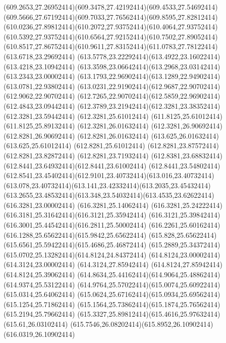 {{	\curveto(609.2653,27.26952414)(609.3478,27.42192414)(609.4533,27.54692414)
	\curveto(609.5666,27.67192414)(609.7033,27.76562414)(609.8595,27.82812414)
	\curveto(610.0236,27.89812414)(610.2072,27.93752414)(610.4064,27.93752414)
	\curveto(610.5392,27.93752414)(610.6564,27.92152414)(610.7502,27.89052414)
	\curveto(610.8517,27.86752414)(610.9611,27.83152414)(611.0783,27.78122414)
	\closepath
	\moveto(613.6718,23.29692414)
	\curveto(613.5778,23.22292414)(613.4922,23.16022414)(613.4218,23.10942414)
	\curveto(613.3598,23.06642414)(613.2968,23.03142414)(613.2343,23.00002414)
	\curveto(613.1793,22.96902414)(613.1289,22.94902414)(613.0781,22.93802414)
	\curveto(613.0231,22.91902414)(612.9687,22.90702414)(612.9062,22.90702414)
	\curveto(612.7265,22.90702414)(612.5859,22.96902414)(612.4843,23.09442414)
	\curveto(612.3789,23.21942414)(612.3281,23.38352414)(612.3281,23.59442414)
	\lineto(612.3281,25.61012414)
	\lineto(611.8125,25.61012414)
	\lineto(611.8125,25.89132414)
	\lineto(612.3281,26.01632414)
	\lineto(612.3281,26.90692414)
	\lineto(612.8281,26.90692414)
	\lineto(612.8281,26.01632414)
	\lineto(613.625,26.01632414)
	\lineto(613.625,25.61012414)
	\lineto(612.8281,25.61012414)
	\lineto(612.8281,23.87572414)
	\lineto(612.8281,23.82872414)
	\lineto(612.8281,23.71932414)
	\curveto(612.8381,23.68832414)(612.8441,23.64932414)(612.8441,23.61002414)
	\lineto(612.8441,23.54802414)
	\curveto(612.8541,23.45402414)(612.9101,23.40732414)(613.016,23.40732414)
	\curveto(613.078,23.40732414)(613.141,23.42332414)(613.2035,23.45432414)
	\curveto(613.2655,23.48532414)(613.348,23.54032414)(613.4535,23.62622414)
	\closepath
	\moveto(616.3281,23.00002414)
	\lineto(616.3281,25.14062414)
	\curveto(616.3281,25.24222414)(616.3181,25.31642414)(616.3121,25.35942414)
	\curveto(616.3121,25.39842414)(616.3001,25.44542414)(616.2811,25.50002414)
	\curveto(616.2261,25.60162414)(616.1288,25.65622414)(615.9842,25.65622414)
	\curveto(615.828,25.65622414)(615.6561,25.59422414)(615.4686,25.46872414)
	\curveto(615.2889,25.34372414)(615.0702,25.13282414)(614.8124,24.84372414)
	\lineto(614.8124,23.00002414)
	\lineto(614.3124,23.00002414)
	\lineto(614.3124,27.85942414)
	\lineto(614.8124,27.85942414)
	\lineto(614.8124,25.39062414)
	\curveto(614.8634,25.44162414)(614.9064,25.48862414)(614.9374,25.53122414)
	\curveto(614.9764,25.57022414)(615.0074,25.60922414)(615.0314,25.64062414)
	\curveto(615.0624,25.67162414)(615.0934,25.69562414)(615.1254,25.71862414)
	\curveto(615.1564,25.73862414)(615.1874,25.76562414)(615.2194,25.79662414)
	\curveto(615.3327,25.89812414)(615.4616,25.97632414)(615.61,26.03102414)
	\curveto(615.7546,26.08202414)(615.8952,26.10902414)(616.0319,26.10902414)
}}
